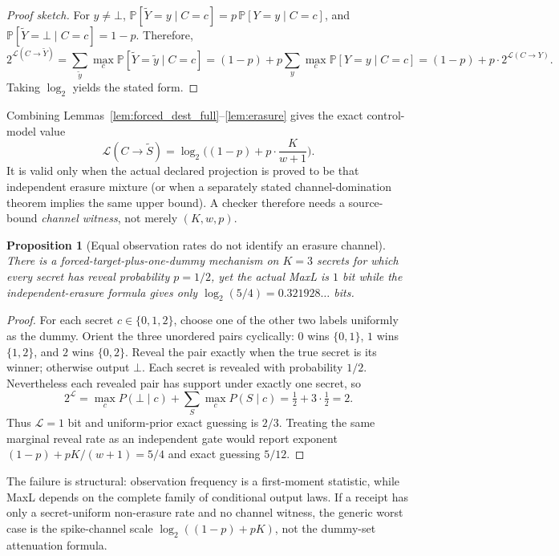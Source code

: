 \documentclass[11pt]{article}
\newcommand{\Prb}{\mathbb{P}}
\newcommand{\MaxL}{\mathcal{L}}
\newcommand{\logtwo}{\log_2}
\newtheorem{proposition}{Proposition}
\begin{document}
\begin{proof}[Proof sketch]
For $y\neq\bot$, $\Prb[\tilde Y=y\mid C=c]=p\,\Prb[Y=y\mid C=c]$, and $\Prb[\tilde Y=\bot\mid C=c]=1-p$. Therefore,
\[
2^{\MaxL(C\to \tilde Y)}=\sum_{\tilde y}\max_c \Prb[\tilde Y=\tilde y\mid C=c]
=(1-p)+p\sum_{y}\max_c \Prb[Y=y\mid C=c]
=(1-p)+p\cdot 2^{\MaxL(C\to Y)}.
\]
Taking $\logtwo$ yields the stated form.
\end{proof}

Combining Lemmas~\ref{lem:forced_dest_full}--\ref{lem:erasure} gives the exact control-model value
\[
\MaxL(C\!\to\!\tilde S)=\logtwo\!\Big((1-p)+p\cdot \frac{K}{w+1}\Big).
\]
It is valid only when the actual declared projection is proved to be that independent erasure mixture (or when a separately stated channel-domination theorem implies the same upper bound). A checker therefore needs a source-bound \emph{channel witness}, not merely $(K,w,p)$.

\begin{proposition}[Equal observation rates do not identify an erasure channel]\label{prop:scalar-p-fails}
There is a forced-target-plus-one-dummy mechanism on $K=3$ secrets for which every secret has reveal probability $p=1/2$, yet the actual MaxL is $1$ bit while the independent-erasure formula gives only $\logtwo(5/4)=0.321928\ldots$ bits.
\end{proposition}
\begin{proof}
For each secret $c\in\{0,1,2\}$, choose one of the other two labels uniformly as the dummy. Orient the three unordered pairs cyclically: $0$ wins $\{0,1\}$, $1$ wins $\{1,2\}$, and $2$ wins $\{0,2\}$. Reveal the pair exactly when the true secret is its winner; otherwise output $\bot$.
Each secret is revealed with probability $1/2$. Nevertheless each revealed pair has support under exactly one secret, so
\[
2^{\MaxL}=\max_c P(\bot\mid c)+\sum_{S}\max_c P(S\mid c)=\tfrac12+3\cdot\tfrac12=2.
\]
Thus $\MaxL=1$ bit and uniform-prior exact guessing is $2/3$. Treating the same marginal reveal rate as an independent gate would report exponent $(1-p)+pK/(w+1)=5/4$ and exact guessing $5/12$.
\end{proof}

The failure is structural: observation frequency is a first-moment statistic, while MaxL depends on the complete family of conditional output laws. If a receipt has only a secret-uniform non-erasure rate and no channel witness, the generic worst case is the spike-channel scale $\logtwo((1-p)+pK)$, not the dummy-set attenuation formula.
\end{document}
